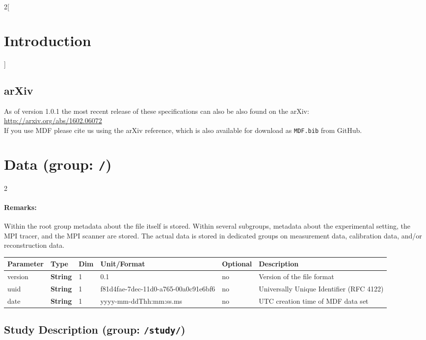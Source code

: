 \documentclass[landscape]{article} %
\newcommand{\inl}[1]{\lstinline[columns=fixed]{#1}}
\newcommand{\inltab}[1]{{\ttfamily\bfseries\color{blue}#1}}
\newcommand{\inlvar}[1]{{\ttfamily#1}}
\begin{document}
\begin{multicols}{2}[\section{Introduction} \label{Sec:Introduction}]
\subsection{arXiv}
As of version 1.0.1 the most recent release of these specifications can also be also found on the arXiv:\\
\hspace*{1cm}\url{http://arxiv.org/abs/1602.06072}\\
If you use MDF please cite us using the arXiv reference, which is also available for download as \texttt{MDF.bib} from GitHub.

\end{multicols}

\section{Data (group: \inl{/})}
 \setlength\extrarowheight{5pt}

\begin{multicols}{2}

\paragraph{Remarks:} Within the root group metadata about the file itself is stored. Within several subgroups, metadata about the experimental setting, the MPI tracer, and the MPI scanner are stored. The actual data is stored in dedicated groups on measurement data, calibration data, and/or reconstruction data.

\end{multicols}


\noindent \begin{tabularx}{\columnwidth}{lllllX} 
\textbf{Parameter} & \textbf{Type} & \textbf{Dim} & \textbf{Unit/Format} & \textbf{Optional} & \textbf{Description} \\ \hline 
\inlvar{version} & \inltab{String} & 1 & 0.1 & no & Version of the file format \\ \hline
\inlvar{uuid} & \inltab{String} & 1 & f81d4fae-7dec-11d0-a765-00a0c91e6bf6 & no & Universally Unique Identifier (RFC 4122) \\ \hline 
\inlvar{date} & \inltab{String} & 1 & yyyy-mm-ddThh:mm:ss.ms & no & UTC creation time of MDF data set \\ \hline
\end{tabularx}


\subsection{Study Description (group: \inl{/study/})}
\end{document}
